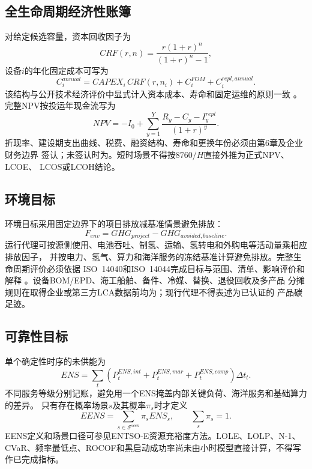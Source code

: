 \subsection{全生命周期经济性账簿}

对给定候选容量，资本回收因子为
\begin{equation}
CRF(r,n)=\frac{r(1+r)^n}{(1+r)^n-1},
\label{eq:crf}
\end{equation}
设备$i$的年化固定成本可写为
\begin{equation}
C_i^{annual}=CAPEX_i\,CRF(r,n_i)+C_i^{FOM}+C_i^{repl,annual}.
\label{eq:annualized-cost}
\end{equation}
该结构与公开技术经济评价中显式计入资本成本、寿命和固定运维的原则一致
\cite{nrel-atb,iec60300}。完整NPV按投运年现金流写为
\begin{equation}
NPV=-I_0+\sum_{y=1}^{Y}
\frac{R_y-C_y-I_y^{repl}}{(1+r)^y}.
\label{eq:npv}
\end{equation}
折现率、建设期支出曲线、税费、融资结构、寿命和更换年份必须由第6章及企业财务边界
签认；未签认时为\assumptiontag。短时场景不得按$8760/H$直接外推为正式NPV、LCOE、
LCOS或LCOH结论。

\subsection{环境目标}

环境目标采用固定边界下的项目排放减基准情景避免排放：
\begin{equation}
F_{env}=GHG_{project}-GHG_{avoided,baseline}.
\label{eq:environment-objective}
\end{equation}
运行代理可按源侧使用、电池吞吐、制氢、运输、氢转电和外购电等活动量乘相应排放因子，
并按电力、氢气、算力和海洋服务的冻结基准计算避免排放。完整生命周期评价必须依据
ISO~14040和ISO~14044完成目标与范围、清单、影响评价和解释
\cite{iso14040,iso14044}。设备BOM/EPD、海工船舶、备件、冷媒、替换、退役回收及多产品
分摊规则在取得企业或第三方LCA数据前均为\assumptiontag；现行代理不得表述为已认证的
产品碳足迹。

\subsection{可靠性目标}

单个确定性时序的未供能为
\begin{equation}
ENS=\sum_t\left(P_t^{ENS,int}+P_t^{ENS,mar}
+P_t^{ENS,comp}\right)\Delta t_t.
\label{eq:ens}
\end{equation}
不同服务等级分别记账，避免用一个ENS掩盖内部关键负荷、海洋服务和基础算力的差异。
只有存在概率场景$s$及其概率$\pi_s$时才定义
\begin{equation}
EENS=\sum_{s\in\mathcal S^{scen}}\pi_sENS_s,
\qquad \sum_s\pi_s=1.
\label{eq:eens}
\end{equation}
EENS定义和场景口径可参见ENTSO-E资源充裕度方法\cite{entsoe-maf}。LOLE、LOLP、N-1、
CVaR、频率最低点、ROCOF和黑启动成功率尚未由小时模型直接计算，不得写作已完成指标。


